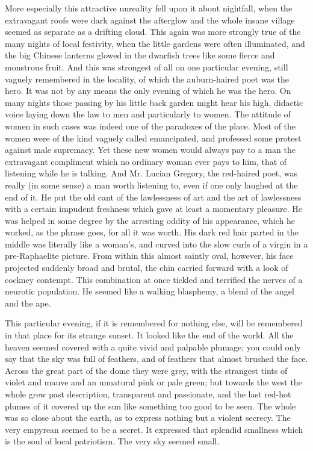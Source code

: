 \documentclass{book}
\begin{document}
More especially this attractive unreality fell upon it about nightfall, when the extravagant roofs were dark against the afterglow and the whole insane village seemed as separate as a drifting cloud. This again was more strongly true of the many nights of local festivity, when the little gardens were often illuminated, and the big Chinese lanterns glowed in the dwarfish trees like some fierce and monstrous fruit. And this was strongest of all on one particular evening, still vaguely remembered in the locality, of which the auburn-haired poet was the hero. It was not by any means the only evening of which he was the hero. On many nights those passing by his little back garden might hear his high, didactic voice laying down the law to men and particularly to women. The attitude of women in such cases was indeed one of the paradoxes of the place. Most of the women were of the kind vaguely called emancipated, and professed some protest against male supremacy. Yet these new women would always pay to a man the extravagant compliment which no ordinary woman ever pays to him, that of listening while he is talking. And Mr. Lucian Gregory, the red-haired poet, was really (in some sense) a man worth listening to, even if one only laughed at the end of it. He put the old cant of the lawlessness of art and the art of lawlessness with a certain impudent freshness which gave at least a momentary pleasure. He was helped in some degree by the arresting oddity of his appearance, which he worked, as the phrase goes, for all it was worth. His dark red hair parted in the middle was literally like a woman’s, and curved into the slow curls of a virgin in a pre-Raphaelite picture. From within this almost saintly oval, however, his face projected suddenly broad and brutal, the chin carried forward with a look of cockney contempt. This combination at once tickled and terrified the nerves of a neurotic population. He seemed like a walking blasphemy, a blend of the angel and the ape.

This particular evening, if it is remembered for nothing else, will be remembered in that place for its strange sunset. It looked like the end of the world. All the heaven seemed covered with a quite vivid and palpable plumage; you could only say that the sky was full of feathers, and of feathers that almost brushed the face. Across the great part of the dome they were grey, with the strangest tints of violet and mauve and an unnatural pink or pale green; but towards the west the whole grew past description, transparent and passionate, and the last red-hot plumes of it covered up the sun like something too good to be seen. The whole was so close about the earth, as to express nothing but a violent secrecy. The very empyrean seemed to be a secret. It expressed that splendid smallness which is the soul of local patriotism. The very sky seemed small.
\end{document}
